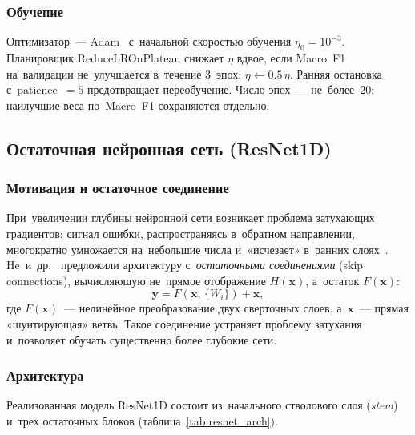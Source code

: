 \subsubsection{Обучение}

Оптимизатор~--- Adam~\cite{kingma2014} с~начальной скоростью обучения
$\eta_0 = 10^{-3}$.
Планировщик ReduceLROnPlateau снижает $\eta$ вдвое, если Macro~F1
на~валидации не~улучшается в~течение $3$~эпох:
$\eta \leftarrow 0.5\,\eta$.
Ранняя остановка с~patience~$=5$ предотвращает переобучение.
Число эпох~--- не~более~$20$; наилучшие веса по~Macro~F1 сохраняются
отдельно.

\subsection{Остаточная нейронная сеть (ResNet1D)}

\subsubsection{Мотивация и остаточное соединение}

При~увеличении глубины нейронной сети возникает проблема
затухающих градиентов: сигнал ошибки, распространяясь в~обратном
направлении, многократно умножается на~небольшие числа и~«исчезает»
в~ранних слоях~\cite{goodfellow2016}.
He~и~др.~\cite{he2016} предложили архитектуру с~\textit{остаточными
соединениями} (skip connections), вычисляющую не~прямое
отображение $H(\mathbf{x})$, а~остаток $F(\mathbf{x})$:
\begin{equation}
    \label{eq:residual}
    \mathbf{y} = F(\mathbf{x},\,\{W_i\}) + \mathbf{x},
\end{equation}
где $F(\mathbf{x})$~--- нелинейное преобразование двух сверточных
слоев, а~$\mathbf{x}$~--- прямая «шунтирующая» ветвь.
Такое соединение устраняет проблему затухания и~позволяет
обучать существенно более глубокие сети.

\subsubsection{Архитектура}

Реализованная модель ResNet1D состоит из~начального стволового
слоя (\textit{stem}) и~трех остаточных блоков
(таблица~\ref{tab:resnet_arch}).

